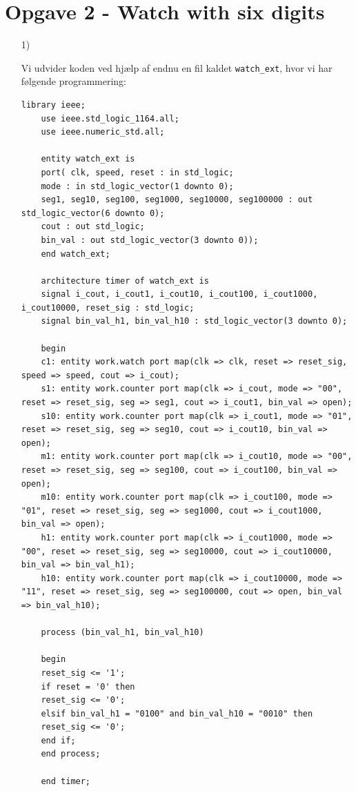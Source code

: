 \section{Opgave 2 - Watch with six digits}
\begin{enumerate}
	\item[1)]
	
	Vi udvider koden ved hjælp af endnu en fil kaldet \verb|watch_ext|, hvor vi har følgende programmering:
	
	\begin{lstlisting}[caption={VHDL code for binary circular watch with 6 digits},label={lst:Watch6digits}]
	library ieee;
	use ieee.std_logic_1164.all;
	use ieee.numeric_std.all;
	
	entity watch_ext is
	port( clk, speed, reset : in std_logic;
	mode : in std_logic_vector(1 downto 0);
	seg1, seg10, seg100, seg1000, seg10000, seg100000 : out std_logic_vector(6 downto 0);
	cout : out std_logic;
	bin_val : out std_logic_vector(3 downto 0));
	end watch_ext;
	
	architecture timer of watch_ext is
	signal i_cout, i_cout1, i_cout10, i_cout100, i_cout1000, i_cout10000, reset_sig : std_logic; 
	signal bin_val_h1, bin_val_h10 : std_logic_vector(3 downto 0);
	
	begin
	c1: entity work.watch port map(clk => clk, reset => reset_sig, speed => speed, cout => i_cout);
	s1: entity work.counter port map(clk => i_cout, mode => "00", reset => reset_sig, seg => seg1, cout => i_cout1, bin_val => open);
	s10: entity work.counter port map(clk => i_cout1, mode => "01", reset => reset_sig, seg => seg10, cout => i_cout10, bin_val => open);
	m1: entity work.counter port map(clk => i_cout10, mode => "00", reset => reset_sig, seg => seg100, cout => i_cout100, bin_val => open);
	m10: entity work.counter port map(clk => i_cout100, mode => "01", reset => reset_sig, seg => seg1000, cout => i_cout1000, bin_val => open);
	h1: entity work.counter port map(clk => i_cout1000, mode => "00", reset => reset_sig, seg => seg10000, cout => i_cout10000, bin_val => bin_val_h1);
	h10: entity work.counter port map(clk => i_cout10000, mode => "11", reset => reset_sig, seg => seg100000, cout => open, bin_val => bin_val_h10);
	
	process (bin_val_h1, bin_val_h10)
	
	begin
	reset_sig <= '1';
	if reset = '0' then
	reset_sig <= '0';
	elsif bin_val_h1 = "0100" and bin_val_h10 = "0010" then
	reset_sig <= '0';
	end if;
	end process;
	
	end timer;
	

\end{lstlisting}
\end{enumerate}
